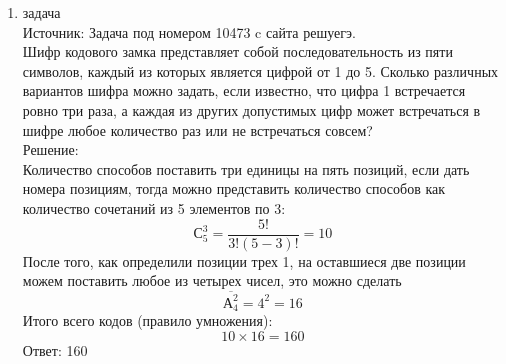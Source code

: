 \documentclass[a4paper,14pt]{extreport} %
\begin{document}
\begin{center}
\begin{enumerate}
						 \item {\large задача  }\\
						 Источник: Задача под номером 10473 c сайта решуегэ.\\
						 \vspace{15pt}
						 Шифр кодового замка представляет собой последовательность из пяти символов, каждый из которых является цифрой от 1 до 5. Сколько различных вариантов шифра можно задать, если известно, что цифра 1 встречается ровно три раза, а каждая из других допустимых цифр может встречаться в шифре любое количество раз или не встречаться совсем?
						 \\
						 \vspace{15pt}
						 Решение:\\
						 Количество способов поставить три единицы на пять позиций, если дать номера позициям, тогда можно представить количество способов как количество сочетаний из 5 элементов по 3:
						 \begin{equation}
						 	С_{5}^3 = \frac{5!}{3!(5-3)!} = 10
						 \end{equation}
						 После того, как определили позиции трех 1, на оставшиеся две позиции можем поставить любое из четырех чисел, это можно сделать
						 \begin{equation}
						 	\overline{А_{4}^2} = 4^2 = 16
						 \end{equation}
						 Итого всего кодов (правило умножения):
						 \begin{equation}
						 	10 \times 16 = 160
						 \end{equation}
						 Ответ: 160
						 

\end{enumerate}
\end{center}
\end{document}
